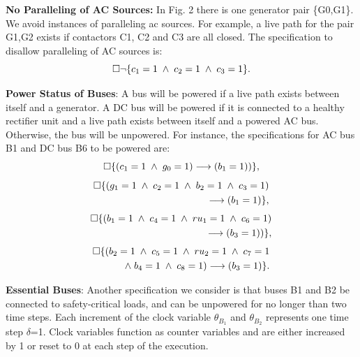 \documentclass[journal]{IEEEtran}
\newcommand{\always}{\square}
\newcommand{\aand}{\hspace{1mm}\wedge\hspace{1mm}}
\begin{document}
{\bf No Paralleling of AC Sources:} In Fig. 2 there is one generator pair \{G0,G1\}. We avoid instances of paralleling ac sources. For example, a live path for the pair {G1,G2} exists if contactors C1, C2 and C3 are all closed. The specification to disallow paralleling of AC sources is:
\begin{equation}
\always \lnot \{c_{1} = 1 \aand c_{2} = 1 \aand c_{3} = 1\}.
\end{equation}

{\bf Power Status of Buses}: A bus will be powered if a live path exists between itself and a generator. A DC bus will be powered if it is connected to a healthy rectifier unit and a live path exists between itself and a powered AC bus. Otherwise, the bus will be unpowered. For instance, the specifications for AC bus B1 and DC bus B6 to be powered are:
\begin{equation}
\always \{(c_{1} = 1 \aand g_{0} = 1) \longrightarrow (b_{1} = 1))\},
\end{equation}
\begin{equation}
\begin{aligned}
\always \{(g_{1} = 1 \aand c_{2} = 1 \aand b_{2} = 1 \aand c_{3} = 1) \\ \longrightarrow (b_{1} = 1)\},
\end{aligned}
\end{equation}
\begin{equation}
\begin{aligned}
\always \{(b_{1} = 1 \aand c_{4} = 1 \aand ru_{1} = 1 \aand c_{6} = 1) \\ \longrightarrow (b_{3} = 1))\},
\end{aligned}
\end{equation}
\begin{equation}
\begin{aligned}
\always \{(b_{2} = 1 \aand c_{5} = 1 \aand ru_{2} = 1 \aand c_{7} = 1 \\ \aand b_{4} = 1 \aand c_{8} = 1) \longrightarrow (b_{3} = 1)\}.
\end{aligned}
\end{equation}

{\bf Essential Buses}: Another specification we consider is that buses B1 and B2 be connected to safety-critical loads, and can be unpowered for no longer than two time steps. Each increment of the clock variable $\theta_{B_{1}}$ and $\theta_{B_{2}}$ represents one time step $\delta$=1. Clock variables function as counter variables and are either increased by 1 or reset to 0 at each step of the execution.
\end{document}
